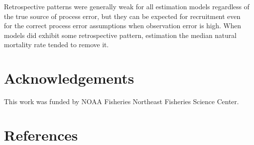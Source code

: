 \documentclass[
  12pt,
]{article}
\begin{document}
Retrospective patterns were generally weak for all estimation models
regardless of the true source of process error, but they can be expected
for recruitment even for the correct process error assumptions when
observation error is high. When models did exhibit some retrospective
pattern, estimation the median natural mortality rate tended to remove
it.

\hypertarget{acknowledgements}{%
\section*{Acknowledgements}\label{acknowledgements}}

This work was funded by NOAA Fisheries Northeast Fisheries Science
Center.

\pagebreak

\hypertarget{references}{%
\section*{References}\label{references}}
\end{document}
